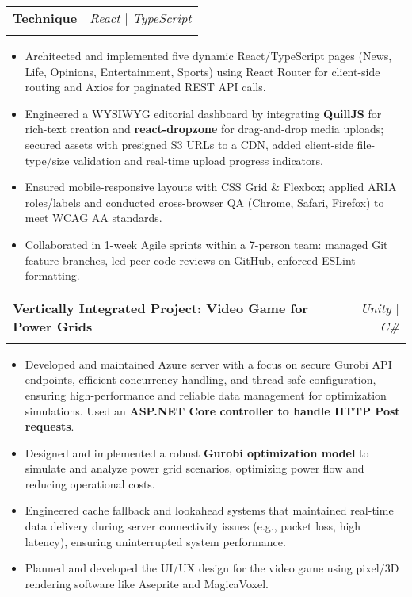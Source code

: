 \documentclass[letterpaper,11pt]{article}
\makeatletter
\newcommand{\resumeItem}[1]{
  \item\small{
    {#1 \vspace{-2pt}}
  }
}
\newcommand{\resumeSubheading}[4]{
  \vspace{-2pt}\item
    \begin{tabular*}{0.97\textwidth}[t]{l@{\extracolsep{\fill}}r}
      \textbf{#1} & #2 \\
      \textit{\small#3} & \textit{\small #4} \\
    \end{tabular*}\vspace{-7pt}
}
\newcommand{\resumeItemListStart}{\begin{itemize}}
\newcommand{\resumeItemListEnd}{\end{itemize}\vspace{-8pt}}
\makeatother
\begin{document}
    \resumeSubheading
    {Technique}{\textit{React $|$ TypeScript}}
    {}{}
    \resumeItemListStart
    \vspace{-5mm}
      \resumeItem{Architected and implemented five dynamic React/TypeScript pages (News, Life, Opinions, Entertainment, Sports) using React Router for client-side routing and Axios for paginated REST API calls.}
      \resumeItem{Engineered a WYSIWYG editorial dashboard by integrating \textbf{QuillJS} for rich-text creation and \textbf{react-dropzone} for drag-and-drop media uploads; secured assets with presigned S3 URLs to a CDN, added client-side file-type/size validation and real-time upload progress indicators.}
      \resumeItem{Ensured mobile-responsive layouts with CSS Grid \& Flexbox; applied ARIA roles/labels and conducted cross-browser QA (Chrome, Safari, Firefox) to meet WCAG AA standards.}
      \resumeItem{Collaborated in 1-week Agile sprints within a 7-person team: managed Git feature branches, led peer code reviews on GitHub, enforced ESLint formatting.}
    \resumeItemListEnd


    \resumeSubheading
      {Vertically Integrated Project: Video Game for Power Grids}{\textit{Unity $|$ C\#}}
      {}{}
      \resumeItemListStart
      \vspace{-5mm}
        \resumeItem{Developed and maintained Azure server with a focus on secure Gurobi API endpoints, efficient concurrency handling, and thread-safe configuration, ensuring high-performance and reliable data management for optimization simulations. Used an \textbf{ASP.NET Core controller to handle HTTP Post requests}.}
        \resumeItem{Designed and implemented a robust \textbf{Gurobi optimization model} to simulate and analyze power grid scenarios, optimizing power flow and reducing operational costs.}
        \resumeItem{Engineered cache fallback and lookahead systems that maintained real-time data delivery during server connectivity issues (e.g., packet loss, high latency), ensuring uninterrupted system performance.}
        \resumeItem{Planned and developed the UI/UX design for the video game using pixel/3D rendering software like Aseprite and MagicaVoxel.} 
    \resumeItemListEnd

\end{document}
